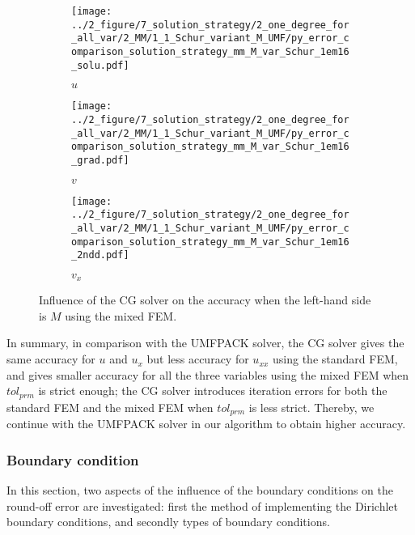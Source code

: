 \documentclass[review,3p]{elsarticle}
\begin{document}
\begin{figure}[!ht]
    \begin{subfigure}{5.5cm}
        \texttt{[image: ../2\_figure/7\_solution\_strategy/2\_one\_degree\_for\_all\_var/2\_MM/1\_1\_Schur\_variant\_M\_UMF/py\_error\_comparison\_solution\_strategy\_mm\_M\_var\_Schur\_1em16\_solu.pdf]}
        \caption{$u$}
        \label{py_bench_Pois_MM_error_solution_strategy_schur_1em16_M_variant_solu}
    \end{subfigure}
    \hspace{-0.2cm}
    \begin{subfigure}{5.5cm}
        \texttt{[image: ../2\_figure/7\_solution\_strategy/2\_one\_degree\_for\_all\_var/2\_MM/1\_1\_Schur\_variant\_M\_UMF/py\_error\_comparison\_solution\_strategy\_mm\_M\_var\_Schur\_1em16\_grad.pdf]}
        \caption{$v$}
        \label{py_bench_Pois_MM_error_solution_strategy_schur_1em16_M_variant_grad}
    \end{subfigure}
    \hspace{-0.2cm}
    \begin{subfigure}{5.5cm}
        \texttt{[image: ../2\_figure/7\_solution\_strategy/2\_one\_degree\_for\_all\_var/2\_MM/1\_1\_Schur\_variant\_M\_UMF/py\_error\_comparison\_solution\_strategy\_mm\_M\_var\_Schur\_1em16\_2ndd.pdf]}
        \caption{$v_x$}
        \label{py_bench_Pois_MM_error_solution_strategy_schur_1em16_M_variant_2ndd}
    \end{subfigure}
\caption{Influence of the CG solver on the accuracy when the left-hand side is $M$ using the mixed FEM.}
\label{py_bench_Pois_MM_error_solution_strategy_schur_1em16_M_variant}
\end{figure}

In summary, in comparison with the UMFPACK solver, the CG solver gives the same accuracy for $u$ and $u_{x}$ but less accuracy for $u_{xx}$ using the standard FEM, and gives smaller accuracy for all the three variables using the mixed FEM when $tol_{prm}$ is strict enough; the CG solver introduces iteration errors for both the standard FEM and the mixed FEM when $tol_{prm}$ is less strict. Thereby, we continue with the UMFPACK solver in our algorithm to obtain higher accuracy.


\subsubsection{Boundary condition}	\label{section_sensitivity_BC}

In this section, two aspects of the influence of the boundary conditions on the round-off error are investigated: first the method of implementing the Dirichlet boundary conditions, and secondly types of boundary conditions. 
\end{document}
